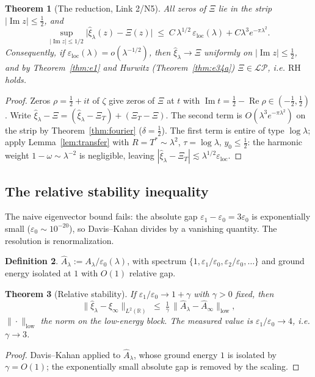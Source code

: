 \documentclass[11pt]{amsart}
\newtheorem{theorem}{Theorem}[section]
\theoremstyle{definition}
\newtheorem{definition}[theorem]{Definition}
\theoremstyle{remark}
\newcommand{\RH}{\mathrm{RH}}
\newcommand{\bbR}{\mathbb{R}}
\newcommand{\xih}{\widehat{\xi}}
\newcommand{\Ah}{\widehat{A}}
\newcommand{\LP}{\mathcal{LP}}
\DeclareMathOperator{\Real}{Re}
\DeclareMathOperator{\Imag}{Im}
\begin{document}
\begin{theorem}[The reduction, Link 2/N5]\label{thm:reduction}
All zeros of $\Xi$ lie in the strip $|\Imag z|\leq\tfrac12$, and
\[
\sup_{|\Imag z|\leq1/2}\big|\xih_\lambda(z)-\Xi(z)\big|
\;\leq\; C\,\lambda^{1/2}\,\varepsilon_{\mathrm{loc}}(\lambda)
+C\lambda^{3}e^{-\pi\lambda^2}.
\]
Consequently, if $\varepsilon_{\mathrm{loc}}(\lambda)=o(\lambda^{-1/2})$, then
$\xih_\lambda\to\Xi$ uniformly on $|\Imag z|\leq\tfrac12$, and by
Theorem~\ref{thm:e1} and Hurwitz (Theorem~\ref{thm:e34a}) $\Xi\in\LP$, i.e.
$\RH$ holds.
\end{theorem}
\begin{proof}
Zeros $\rho=\tfrac12+it$ of $\zeta$ give zeros of $\Xi$ at $t$ with
$\Imag t=\tfrac12-\Real\rho\in(-\tfrac12,\tfrac12)$. Write
$\xih_\lambda-\Xi=(\xih_\lambda-\Xi_T)+(\Xi_T-\Xi)$. The second term is
$O(\lambda^3 e^{-\pi\lambda^2})$ on the strip by Theorem~\ref{thm:fourier}
($\delta=\tfrac12$). The first term is entire of type $\log\lambda$; apply
Lemma~\ref{lem:transfer} with $R=T^\ast\sim\lambda^2$, $\tau=\log\lambda$,
$y_0\leq\tfrac12$: the harmonic weight $1-\omega\sim\lambda^{-2}$ is
negligible, leaving $|\xih_\lambda-\Xi_T|\lesssim\lambda^{1/2}
\varepsilon_{\mathrm{loc}}$.
\end{proof}

\subsection{The relative stability inequality}\label{ssec:stability}
The naive eigenvector bound fails: the absolute gap
$\varepsilon_1-\varepsilon_0=3\varepsilon_0$ is exponentially small
($\varepsilon_0\sim10^{-20}$), so Davis--Kahan divides by a vanishing
quantity. The resolution is renormalization.

\begin{definition}
$\Ah_\lambda:=A_\lambda/\varepsilon_0(\lambda)$, with spectrum
$\{1,\varepsilon_1/\varepsilon_0,\varepsilon_2/\varepsilon_0,\dots\}$ and
ground energy isolated at $1$ with $O(1)$ relative gap.
\end{definition}

\begin{theorem}[Relative stability]\label{thm:relstab}
If $\varepsilon_1/\varepsilon_0\to1+\gamma$ with $\gamma>0$ fixed, then
\[
\|\xih_\lambda-\xih_\infty\|_{L^2(\bbR)}
\;\leq\;\tfrac1\gamma\,\|\Ah_\lambda-\Ah_\infty\|_{\mathrm{low}},
\]
$\|\cdot\|_{\mathrm{low}}$ the norm on the low-energy block. The measured value
is $\varepsilon_1/\varepsilon_0\to4$, i.e. $\gamma\to3$.
\end{theorem}
\begin{proof}
Davis--Kahan applied to $\Ah_\lambda$, whose ground energy $1$ is isolated by
$\gamma=O(1)$; the exponentially small absolute gap is removed by the scaling.
\end{proof}
\end{document}
